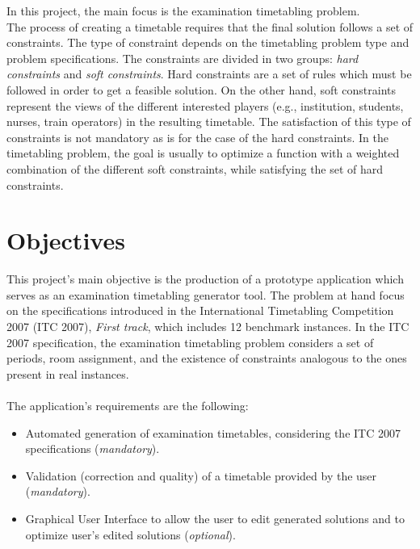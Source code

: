 In this project, the main focus is the examination timetabling problem. \\

The process of creating a timetable requires that the final solution follows a set of constraints. The type of constraint depends on the timetabling problem type and problem specifications. The constraints are divided in two groups: \textit{hard constraints} and \textit{soft constraints}. Hard constraints are a set of rules which must be followed in order to get a feasible solution. On the other hand, soft constraints represent the views of the different interested players (e.g., institution, students, nurses, train operators) in the resulting timetable. The satisfaction of this type of constraints is not mandatory as is for the case of the hard constraints. In the timetabling problem, the goal is usually to optimize a function with a weighted combination of the different soft constraints, while satisfying the set of hard constraints. 

\section{Objectives}
\label{section:Objts}

This project's main objective is the production of a prototype application which serves as an examination timetabling generator tool. The problem at hand focus on the specifications introduced in the International Timetabling Competition 2007 (ITC 2007), \textit{First track}, which includes 12 benchmark instances. In the ITC 2007 specification, the examination timetabling problem considers a set of periods, room assignment, and the existence of constraints analogous to the ones present in real instances.\\
\\
The application's requirements are the following:

\begin{itemize}
	\item Automated generation of examination timetables, considering the ITC 2007 specifications (\textit{mandatory}).
	\item Validation (correction and quality) of a timetable provided by the user (\textit{mandatory}).
	\item Graphical User Interface to allow the user to edit generated solutions and to optimize user's edited solutions (\textit{optional}).
\end{itemize}


